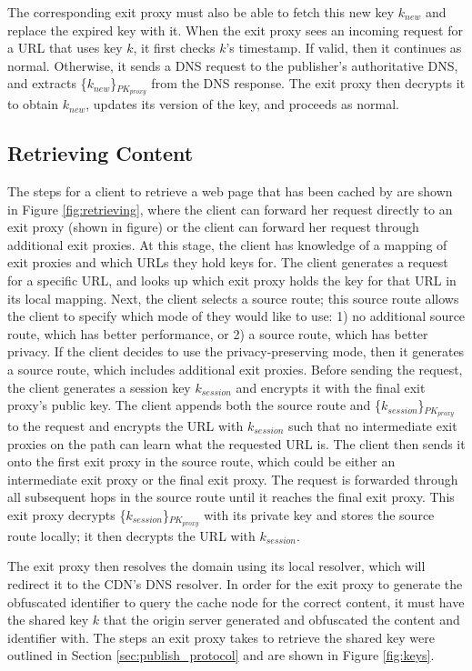 The corresponding exit proxy must also be able to fetch this new key $k_{new}$ and replace the expired key with it.  When the exit proxy 
sees an incoming request for a URL that uses key $k$, it first checks $k$'s timestamp.  If valid, then it continues as normal.  Otherwise, 
it sends a DNS request to the publisher's authoritative DNS, and extracts \{$k_
{new}$\}$_{PK_{proxy}}$ from the DNS response.  The exit 
proxy then decrypts it to obtain $k_{new}$, updates its version of the key, and
proceeds as normal.

\subsection{Retrieving Content}
\label{sec:retrieve}
The steps for a client to retrieve a web page that has been cached by \system{} are shown in Figure \ref{fig:retrieving}, where the client 
can forward her request directly to an exit proxy (shown in figure) or the client can forward her
request through additional exit proxies. At this 
stage, the client has knowledge of a mapping of exit proxies and which URLs they hold 
keys for.  The client generates a request for a specific URL, and looks up which exit proxy holds the key for that URL in its local mapping.  Next, 
the client selects a source route; this source route allows the client to specify which mode of \system{} they would like to use: 1) no additional source 
route, which has better performance, or 2) a source route, which has better privacy.  If the client decides to use the privacy-preserving mode, 
then it generates a source route, which includes additional exit proxies.
Before sending the request, the client generates a session key $k_{session}$ and encrypts it with the final exit proxy's public key.  The client appends both the source route and \{$k_{session}$\}$_{PK_{proxy}}$ to the request and encrypts the URL with $k_{session}$ such that no intermediate exit proxies on the path can learn what the requested URL is.  The client then sends it onto the first exit proxy in the source route, which could be either an intermediate exit proxy or the final exit proxy.  The request is forwarded 
through all subsequent hops in the source route until it reaches the final exit proxy.  This exit proxy decrypts \{$k_{session}$\}$_{PK_{proxy}}$ with its private key and stores 
the source route locally; it then decrypts the URL with $k_{session}$. 

The exit proxy then resolves the domain using its local resolver, which will redirect it to the CDN's DNS resolver. In order for the exit proxy to 
generate the obfuscated identifier to query the cache node for the correct content, 
it must have the shared key $k$ that the origin server generated and obfuscated the content and identifier 
with.  The steps an exit proxy takes to retrieve the shared key were outlined in Section \ref{sec:publish_protocol} and are shown in Figure \ref{fig:keys}.

